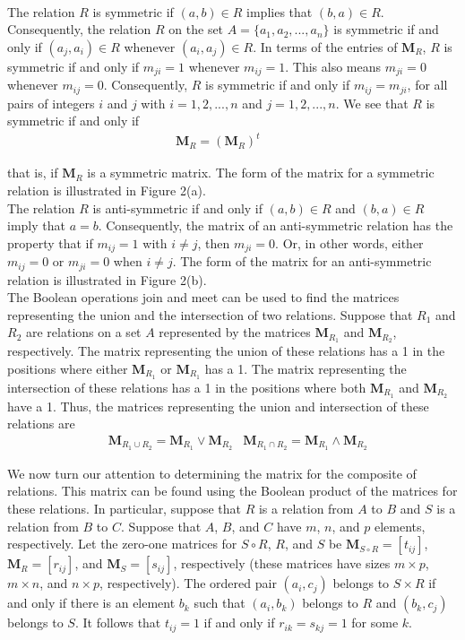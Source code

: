 \documentclass[11pt]{article}
\begin{document}
\\
The relation $R$ is symmetric if $(a, b) \in R$ implies that $(b, a) \in R$. Consequently, the relation $R$ on the set $A = \{a_1, a_2, ..., a_n\}$ is symmetric if and only if $(a_j, a_i) \in R$ whenever $(a_i, a_j) \in R$. In terms of the entries of $\mathbf{M}_R$, $R$ is symmetric if and only if $m_{ji} = 1$ whenever $m_{ij} = 1$. This also means $m_{ji} = 0$ whenever $m_{ij} = 0$. Consequently, $R$ is symmetric if and only if $m_{ij} = m_{ji}$, for all pairs of integers $i$ and $j$ with $i = 1, 2, ..., n$ and $j = 1, 2, ..., n$.  We see that $R$ is symmetric if and only if
\begin{align*}
    \mathbf{M}_R = (\mathbf{M}_R)^t & & &
\end{align*}

\noindent that is, if $\textbf{M}_R$ is a symmetric matrix. The form of the matrix for a symmetric relation is illustrated in Figure 2(a).\\

The relation $R$ is anti-symmetric if and only if $(a, b) \in R$ and $(b, a) \in R$ imply that $a = b$. Consequently, the matrix of an anti-symmetric relation has the property that if $m_{ij} = 1$ with $i \neq j$, then $m_{ji} = 0$. Or, in other words, either $m_{ij} = 0$ or $m_{ji} = 0$ when $i \neq j$. The form of the matrix for an anti-symmetric relation is illustrated in Figure 2(b).\\

The Boolean operations join and meet can be used to find the matrices
representing the union and the intersection of two relations. Suppose that $R_1$ and $R_2$ are relations on a set $A$ represented by the matrices $\textbf{M}_{R_1}$ and $\textbf{M}_{R_2}$, respectively. The matrix representing
the union of these relations has a 1 in the positions where either $\textbf{M}_{R_1}$ or $\textbf{M}_{R_1}$ has a 1. The matrix representing the intersection of these relations has a 1 in the positions where both $\textbf{M}_{R_1}$ and $\textbf{M}_{R_2}$ have a 1. Thus, the matrices representing the union and intersection of these relations are
\begin{align*}
    &\textbf{M}_{R_1 \cup R_2} = \textbf{M}_{R_1} \lor \textbf{M}_{R_2} &\textbf{M}_{R_1 \cap R_2} = \textbf{M}_{R_1} \land \textbf{M}_{R_2}
\end{align*}

We now turn our attention to determining the matrix for the composite of relations. This matrix can be found using the Boolean product of the matrices for these relations. In particular, suppose that $R$ is a relation from $A$ to $B$ and $S$ is a relation from $B$ to $C$. Suppose that $A$, $B$, and $C$ have $m$, $n$, and $p$ elements, respectively. Let the zero-one matrices for $S \circ R$, $R$, and $S$ be $\textbf{M}_{S \circ R} = [t_{ij}]$, $\textbf{M}_R = [r_{ij}]$, and $\textbf{M}_S = [s_{ij}]$, respectively (these matrices have sizes $m \times p$, $m \times n$, and $n \times p$, respectively). The ordered pair $(a_i, c_j)$ belongs to $S \times R$ if and only if there is an element $b_k$ such that $(a_i, b_k)$ belongs to $R$ and $(b_k, c_j)$ belongs to $S$. It follows that $t_{ij} = 1$ if and only if $r_{ik} = s_{kj} = 1$ for some $k$. 
\end{document}
